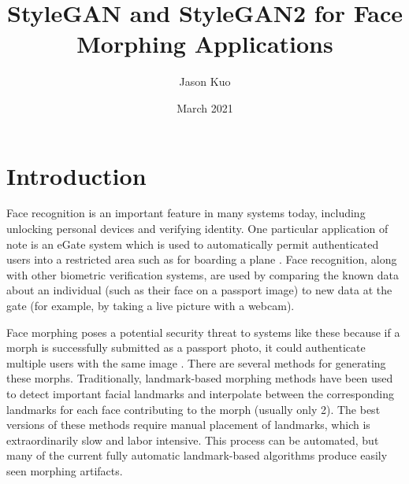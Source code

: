 \documentclass[12pt]{article}
\begin{document}
\title{StyleGAN and StyleGAN2 for Face Morphing Applications}
\author{Jason Kuo}
\date{March 2021}
\maketitle

\begin{abstract}
\end{abstract}

\section{Introduction}
\par
Face recognition is an important feature in many systems today, including unlocking personal devices and verifying identity. One particular application of note is an eGate system which is used to automatically permit authenticated users into a restricted area such as for boarding a plane \cite{magic-passport}. Face recognition, along with other biometric verification systems, are used by comparing the known data about an individual (such as their face on a passport image) to new data at the gate (for example, by taking a live picture with a webcam).
\par
Face morphing poses a potential security threat to systems like these because if a morph is successfully submitted as a passport photo, it could authenticate multiple users with the same image \cite{magic-passport}. There are several methods for generating these morphs. Traditionally, landmark-based morphing methods have been used to detect important facial landmarks and interpolate between the corresponding landmarks for each face contributing to the morph (usually only 2). The best versions of these methods require manual placement of landmarks, which is extraordinarily slow and labor intensive. This process can be automated, but many of the current fully automatic landmark-based algorithms produce easily seen morphing artifacts.
\par
\end{document}
